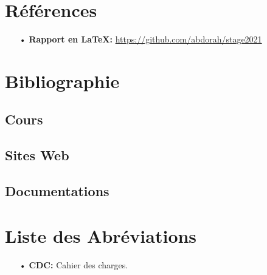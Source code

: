 \documentclass[a4paper]{report}
\begin{document}
\chapter{Références}
\begin{itemize}
	\item[•] \textbf{Rapport en \LaTeX:} \url{https://github.com/abdorah/stage2021}
\end{itemize}
\chapter{Bibliographie}
\section{Cours}
\section{Sites Web}
\section{Documentations}
\chapter{Liste des Abréviations}
\begin{itemize}
	\item[•] \textbf{CDC:} Cahier des charges.
\end{itemize}
\end{document}
